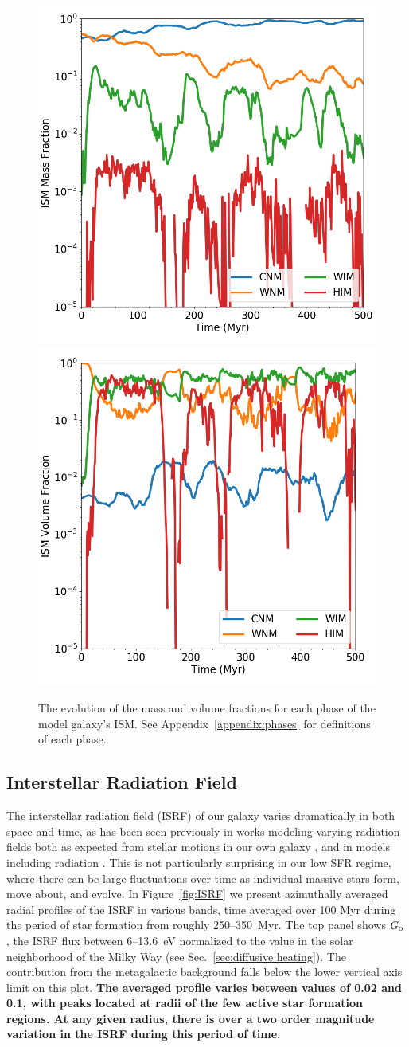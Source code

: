 \documentclass[fleqn,usenatbib,useAMS]{mnras}
\begin{document}
\begin{figure}
\includegraphics[width=0.45\linewidth]{phase_mass_fraction_evolution_log.png}
\includegraphics[width=0.45\linewidth]{phase_volume_fraction_evolution_log.png}
\caption{The evolution of the mass and volume fractions for each phase of the model galaxy's ISM. See Appendix~\ref{appendix:phases} for definitions of each phase.}
\label{fig:ISM_evolution}
\end{figure}

\subsection{Interstellar Radiation Field}
\label{sec:ISRF}

The interstellar radiation field (ISRF) of our galaxy varies dramatically in both space and time, as has been seen previously in works modeling varying radiation fields both as expected from stellar motions in our own galaxy \citep{Parravano2003}, and in models including radiation \citep[e.g.][]{Hu2017}. This is not particularly surprising in our low SFR regime, where there can be large fluctuations over time as individual massive stars form, move about, and evolve. In Figure~\ref{fig:ISRF} we present azimuthally averaged radial profiles of the ISRF in various bands, time averaged over 100 Myr during the period of star formation from roughly 250--350~Myr. The top panel shows $G_{\rm o}$, the ISRF flux between 6--13.6~eV normalized to the value in the solar neighborhood of the Milky Way (see Sec.~\ref{sec:diffusive heating}). The contribution from the metagalactic background falls below the lower vertical axis limit on this plot. \textbf{The averaged profile varies between values of 0.02 and 0.1, with peaks located at radii of the few active star formation regions. At any given radius, there is over a two order magnitude variation in the ISRF during this period of time.}
\end{document}
